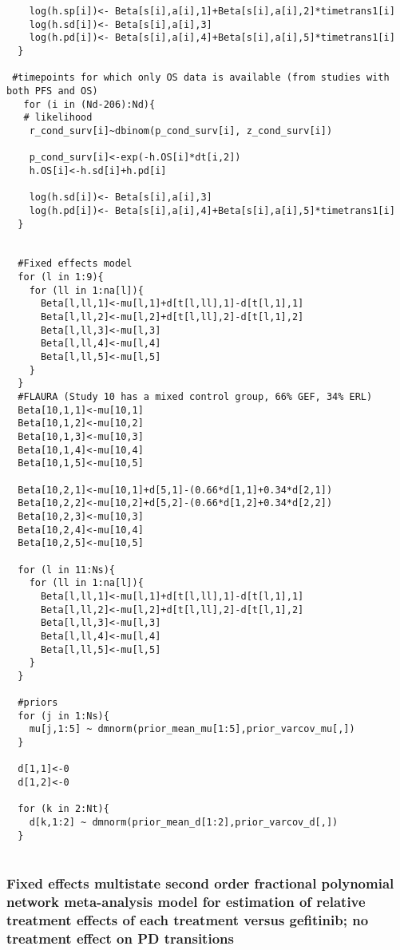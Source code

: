\documentclass[11pt,final,fleqn]{article}\usepackage[]{graphicx}\usepackage[]{color}
\theoremstyle{plain}
\begin{document}
\begin{appendices}
\begin{verbatim}
    log(h.sp[i])<- Beta[s[i],a[i],1]+Beta[s[i],a[i],2]*timetrans1[i] 
    log(h.sd[i])<- Beta[s[i],a[i],3] 
    log(h.pd[i])<- Beta[s[i],a[i],4]+Beta[s[i],a[i],5]*timetrans1[i]
  }
  
 #timepoints for which only OS data is available (from studies with both PFS and OS)
   for (i in (Nd-206):Nd){
   # likelihood
    r_cond_surv[i]~dbinom(p_cond_surv[i], z_cond_surv[i]) 
    
    p_cond_surv[i]<-exp(-h.OS[i]*dt[i,2])
    h.OS[i]<-h.sd[i]+h.pd[i]
    
    log(h.sd[i])<- Beta[s[i],a[i],3] 
    log(h.pd[i])<- Beta[s[i],a[i],4]+Beta[s[i],a[i],5]*timetrans1[i]
  }
    
 
  #Fixed effects model
  for (l in 1:9){
    for (ll in 1:na[l]){
      Beta[l,ll,1]<-mu[l,1]+d[t[l,ll],1]-d[t[l,1],1]
      Beta[l,ll,2]<-mu[l,2]+d[t[l,ll],2]-d[t[l,1],2]
      Beta[l,ll,3]<-mu[l,3]
      Beta[l,ll,4]<-mu[l,4]
      Beta[l,ll,5]<-mu[l,5]
    }
  }
  #FLAURA (Study 10 has a mixed control group, 66% GEF, 34% ERL)
  Beta[10,1,1]<-mu[10,1]
  Beta[10,1,2]<-mu[10,2]
  Beta[10,1,3]<-mu[10,3]
  Beta[10,1,4]<-mu[10,4]
  Beta[10,1,5]<-mu[10,5]
  
  Beta[10,2,1]<-mu[10,1]+d[5,1]-(0.66*d[1,1]+0.34*d[2,1])
  Beta[10,2,2]<-mu[10,2]+d[5,2]-(0.66*d[1,2]+0.34*d[2,2])
  Beta[10,2,3]<-mu[10,3]
  Beta[10,2,4]<-mu[10,4]
  Beta[10,2,5]<-mu[10,5]
  
  for (l in 11:Ns){
    for (ll in 1:na[l]){
      Beta[l,ll,1]<-mu[l,1]+d[t[l,ll],1]-d[t[l,1],1]
      Beta[l,ll,2]<-mu[l,2]+d[t[l,ll],2]-d[t[l,1],2]
      Beta[l,ll,3]<-mu[l,3]
      Beta[l,ll,4]<-mu[l,4]
      Beta[l,ll,5]<-mu[l,5]
    }
  }
  
  #priors
  for (j in 1:Ns){
    mu[j,1:5] ~ dmnorm(prior_mean_mu[1:5],prior_varcov_mu[,]) 
  }
  
  d[1,1]<-0
  d[1,2]<-0

  for (k in 2:Nt){
    d[k,1:2] ~ dmnorm(prior_mean_d[1:2],prior_varcov_d[,]) 
  }
  
  \end{verbatim}


\subsubsection{Fixed effects multistate second order fractional polynomial network meta-analysis model for estimation of relative treatment effects of each treatment versus gefitinib; no treatment effect on PD transitions}
\begin{verbatim} 


\end{verbatim}
\end{appendices}
\end{document}

